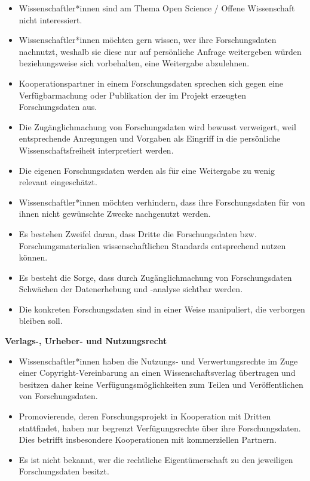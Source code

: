\documentclass[a4paper,
fontsize=11pt,
oneside,
numbers=noperiodatend,
parskip=half-,
bibliography=totoc,
final
]{scrartcl}
\begin{document}
\begin{itemize}
\item
  Wissenschaftler*innen sind am Thema Open Science / Offene Wissenschaft
  nicht interessiert.
\item
  Wissenschaftler*innen möchten gern wissen, wer ihre Forschungsdaten
  nachnutzt, weshalb sie diese nur auf persönliche Anfrage weitergeben
  würden beziehungsweise sich vorbehalten, eine Weitergabe abzulehnen.
\item
  Kooperationspartner in einem Forschungsdaten sprechen sich gegen eine
  Verfügbarmachung oder Publikation der im Projekt erzeugten
  Forschungsdaten aus.
\item
  Die Zugänglichmachung von Forschungsdaten wird bewusst verweigert,
  weil entsprechende Anregungen und Vorgaben als Eingriff in die
  persönliche Wissenschaftsfreiheit interpretiert werden.
\item
  Die eigenen Forschungsdaten werden als für eine Weitergabe zu wenig
  relevant eingeschätzt.
\item
  Wissenschaftler*innen möchten verhindern, dass ihre Forschungsdaten
  für von ihnen nicht gewünschte Zwecke nachgenutzt werden.
\item
  Es bestehen Zweifel daran, dass Dritte die Forschungsdaten bzw.
  Forschungsmaterialien wissenschaftlichen Standards entsprechend nutzen
  können.
\item
  Es besteht die Sorge, dass durch Zugänglichmachung von Forschungsdaten
  Schwächen der Datenerhebung und -analyse sichtbar werden.
\item
  Die konkreten Forschungsdaten sind in einer Weise manipuliert, die
  verborgen bleiben soll.
\end{itemize}

\textbf{Verlags-, Urheber- und Nutzungsrecht}

\begin{itemize}
\item
  Wissenschaftler*innen haben die Nutzungs- und Verwertungsrechte im
  Zuge einer Copyright-Vereinbarung an einen Wissenschaftsverlag
  übertragen und besitzen daher keine Verfügungsmöglichkeiten zum Teilen
  und Veröffentlichen von Forschungsdaten.
\item
  Promovierende, deren Forschungsprojekt in Kooperation mit Dritten
  stattfindet, haben nur begrenzt Verfügungsrechte über ihre
  Forschungsdaten. Dies betrifft insbesondere Kooperationen mit
  kommerziellen Partnern.
\item
  Es ist nicht bekannt, wer die rechtliche Eigentümerschaft zu den
  jeweiligen Forschungsdaten besitzt.
\end{itemize}
\end{document}
